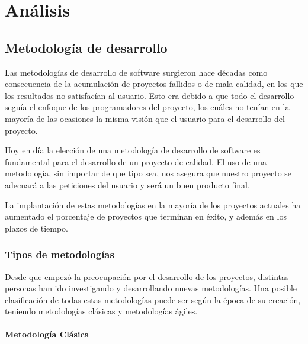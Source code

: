 \chapter{Análisis}


\section{Metodología de desarrollo}

Las metodologías de desarrollo de software surgieron hace décadas como consecuencia de la acumulación de proyectos fallidos o de mala calidad, en los que los resultados no satisfacían al usuario. Esto era debido a que todo el desarrollo seguía el enfoque de los programadores del proyecto, los cuáles no tenían en la mayoría de las ocasiones la misma visión que el usuario para el desarrollo del proyecto.

Hoy en día la elección de una metodología de desarrollo de software es fundamental para el desarrollo de un proyecto de calidad. El uso de una metodología, sin importar de que tipo sea, nos asegura que nuestro proyecto se adecuará a las peticiones del usuario y será un buen producto final.

La implantación de estas metodologías en la mayoría de los proyectos actuales ha aumentado el porcentaje de proyectos que terminan en éxito, y además en los plazos de tiempo.


\subsection{Tipos de metodologías}

Desde que empezó la preocupación por el desarrollo de los proyectos, distintas personas han ido investigando y desarrollando nuevas metodologías. Una posible clasificación de todas estas metodologías puede ser según la época de su creación, teniendo metodologías clásicas y metodologías ágiles.

\subsubsection{Metodología Clásica}


